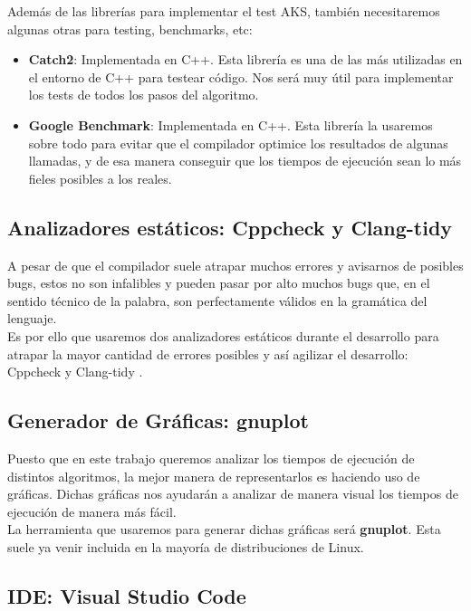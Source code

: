 Además de las librerías para implementar el test AKS, también necesitaremos algunas otras para testing, benchmarks, etc:

\begin{itemize}
	\item \textbf{Catch2}: Implementada en C++. Esta librería es una de las más utilizadas en el entorno de C++ para testear código. Nos será muy útil para implementar los tests de todos los pasos del algoritmo.
	
	\item \textbf{Google Benchmark}: Implementada en C++. Esta librería la usaremos sobre todo para evitar que el compilador optimice los resultados de algunas llamadas, y de esa manera conseguir que los tiempos de ejecución sean lo más fieles posibles a los reales.
\end{itemize}

\subsection{Analizadores estáticos: Cppcheck y Clang-tidy}

A pesar de que el compilador suele atrapar muchos errores y avisarnos de posibles bugs, estos no son infalibles y pueden pasar por alto muchos bugs que, en el sentido técnico de la palabra, son perfectamente válidos en la gramática del lenguaje.\\

Es por ello que usaremos dos analizadores estáticos durante el desarrollo para atrapar la mayor cantidad de errores posibles y así agilizar el desarrollo: Cppcheck \cite{cppcheck} y Clang-tidy \cite{clang_tidy}.

\subsection{Generador de Gráficas: gnuplot}

Puesto que en este trabajo queremos analizar los tiempos de ejecución de distintos algoritmos, la mejor manera de representarlos es haciendo uso de gráficas. Dichas gráficas nos ayudarán a analizar de manera visual los tiempos de ejecución de manera más fácil.\\

La herramienta que usaremos para generar dichas gráficas será \textbf{gnuplot}. Esta suele ya venir incluida en la mayoría de distribuciones de Linux.

\subsection{IDE: Visual Studio Code}

